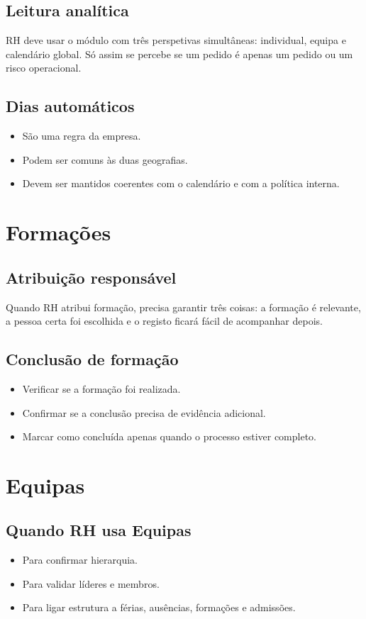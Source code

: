 \subsection{Leitura analítica}
RH deve usar o módulo com três perspetivas simultâneas: individual, equipa e calendário global. Só assim se percebe se um pedido é apenas um pedido ou um risco operacional.

\subsection{Dias automáticos}
\begin{itemize}
  \item São uma regra da empresa.
  \item Podem ser comuns às duas geografias.
  \item Devem ser mantidos coerentes com o calendário e com a política interna.
\end{itemize}

\section{Formações}
\subsection{Atribuição responsável}
Quando RH atribui formação, precisa garantir três coisas: a formação é relevante, a pessoa certa foi escolhida e o registo ficará fácil de acompanhar depois.

\subsection{Conclusão de formação}
\begin{itemize}
  \item Verificar se a formação foi realizada.
  \item Confirmar se a conclusão precisa de evidência adicional.
  \item Marcar como concluída apenas quando o processo estiver completo.
\end{itemize}

\section{Equipas}
\subsection{Quando RH usa Equipas}
\begin{itemize}
  \item Para confirmar hierarquia.
  \item Para validar líderes e membros.
  \item Para ligar estrutura a férias, ausências, formações e admissões.
\end{itemize}

